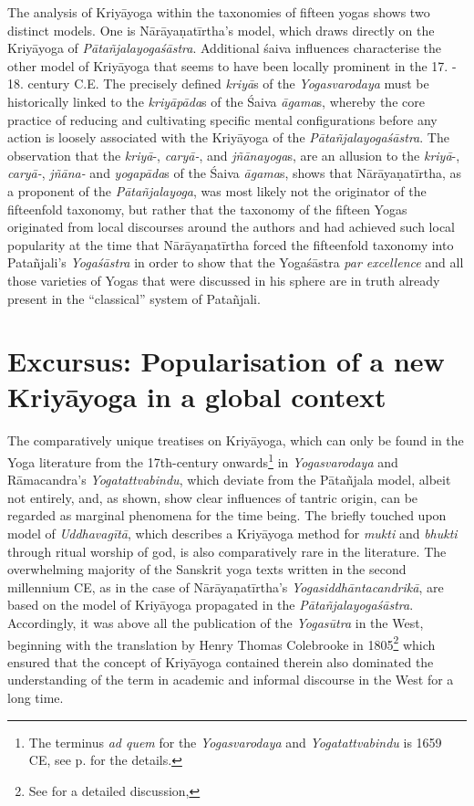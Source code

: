 The analysis of Kriyāyoga within the taxonomies of fifteen yogas shows two distinct models. One is Nārāyaṇatīrtha's model, which draws directly on the Kriyāyoga of \textit{Pātañjalayogaśāstra}. Additional śaiva influences characterise the other model of Kriyāyoga that seems to have been locally prominent in the 17. - 18. century C.E. The precisely defined \textit{kriyā}s of the \textit{Yogasvarodaya} must be historically linked to the \textit{kriyāpāda}s of the Śaiva \textit{āgama}s, whereby the core practice of reducing and cultivating specific mental configurations before any action is loosely associated with the Kriyāyoga of the \textit{Pātañjalayogaśāstra}. The observation that the \textit{kriyā}-, \textit{caryā-}, and \textit{jñānayoga}s, are an allusion to the \textit{kriyā}-, \textit{caryā-}, \textit{jñāna-} and \textit{yogapāda}s of the Śaiva \textit{āgama}s, shows that Nārāyaṇatīrtha, as a proponent of the \textit{Pātañjalayoga}, was most likely not the originator of the fifteenfold taxonomy, but rather that the taxonomy of the fifteen Yogas originated from local discourses around the authors and had achieved such local popularity at the time that Nārāyaṇatīrtha forced the fifteenfold taxonomy into Patañjali's \textit{Yogaśāstra} in order to show that the Yogaśāstra \textit{par excellence} and all those varieties of Yogas that were discussed in his sphere are in truth already present in the ``classical'' system of Patañjali.

\section{Excursus: Popularisation of a new Kriyāyoga in a global context}

The comparatively unique treatises on Kriyāyoga, which can only be found in the Yoga literature from the 17th-century onwards\footnote{The terminus \textit{ad quem} for the \textit{Yogasvarodaya} and \textit{Yogatattvabindu} is 1659 CE, see p.\pageref{dating} for the details.} in \textit{Yogasvarodaya} and Rāmacandra's \textit{Yogatattvabindu}, which deviate from the Pātañjala model, albeit not entirely, and, as shown, show clear influences of tantric origin, can be regarded as marginal phenomena for the time being. The briefly touched upon model of \textit{Uddhavagītā}, which describes a Kriyāyoga method for \textit{mukti} and \textit{bhukti} through ritual worship of god, is also comparatively rare in the literature. The overwhelming majority of the Sanskrit yoga texts written in the second millennium CE, as in the case of Nārāyaṇatīrtha's \textit{Yogasiddhāntacandrikā}, are based on the model of Kriyāyoga propagated in the \textit{Pātañjalayogaśāstra}. Accordingly, it was above all the publication of the \textit{Yogasūtra} in the West, beginning with the translation by Henry Thomas Colebrooke in 1805\footnote{See \parencite{colebrooke2014} for a detailed discussion,} which ensured that the concept of Kriyāyoga contained therein also dominated the understanding of the term in academic and informal discourse in the West for a long time. 

